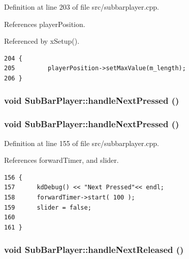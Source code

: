 Definition at line 203 of file src/subbarplayer.cpp.

References player\-Position.

Referenced by x\-Setup().



\footnotesize\begin{verbatim}204 {
205         playerPosition->setMaxValue(m_length);
206 }
\end{verbatim}\normalsize 
{}
\subsubsection{\setlength{\rightskip}{0pt plus 5cm}void Sub\-Bar\-Player::handle\-Next\-Pressed ()\hspace{0.3cm}{\tt  [slot]}}\label{classSubBarPlayer_SubBarPlayeri22}


\subsubsection{\setlength{\rightskip}{0pt plus 5cm}void Sub\-Bar\-Player::handle\-Next\-Pressed ()\hspace{0.3cm}{\tt  [slot]}}\label{classSubBarPlayer_SubBarPlayeri4}




Definition at line 155 of file src/subbarplayer.cpp.

References forward\-Timer, and slider.



\footnotesize\begin{verbatim}156 {
157      kdDebug() << "Next Pressed"<< endl;
158      forwardTimer->start( 100 );
159      slider = false;
160      
161 }
\end{verbatim}\normalsize 
{}
\subsubsection{\setlength{\rightskip}{0pt plus 5cm}void Sub\-Bar\-Player::handle\-Next\-Released ()\hspace{0.3cm}{\tt  [slot]}}\label{classSubBarPlayer_SubBarPlayeri23}


